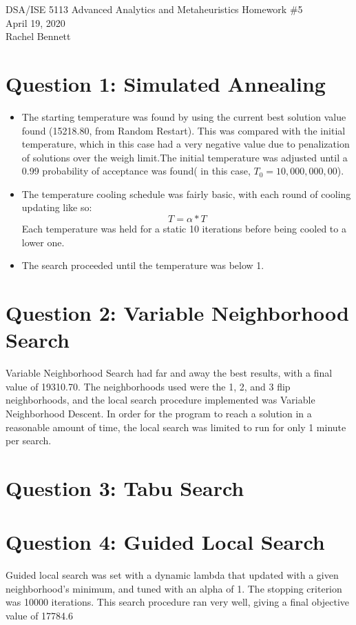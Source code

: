 \documentclass[12pt, letterpaper]{article}
\begin{document}
\begin{center}
\Large DSA/ISE 5113 Advanced Analytics and Metaheuristics
\Large Homework \#5\\
\vspace{3mm}
\normalsize April 19, 2020\\
\vspace{3mm}
\normalsize Rachel Bennett
\end{center}


\section*{Question 1: Simulated Annealing}
\begin{itemize}
\item The starting temperature was found by using the current best solution value found (15218.80, from Random Restart). This was compared with the initial temperature, which in this case had a very negative value due to penalization of solutions over the weigh limit.The initial temperature was adjusted until a 0.99 probability of acceptance was found( in this case, $T_0 =10,000,000,00$).
\item The temperature cooling schedule was fairly basic, with each round of cooling updating like so:
$$ T = \alpha * T$$
Each temperature was held for a static 10 iterations before being cooled to a lower one.
\item The search proceeded until the temperature was below 1. 
\end{itemize}

\section*{Question 2: Variable Neighborhood Search}
Variable Neighborhood Search had far and away the best results, with a final value of 19310.70. The neighborhoods used were the 1, 2, and 3 flip neighborhoods, and the local search procedure implemented was Variable Neighborhood Descent. In order for the program to reach a solution in a reasonable amount of time, the local search was limited to run for only 1 minute per search. 

\section*{Question 3: Tabu Search}



\section*{Question 4: Guided Local Search}
Guided local search was set with a dynamic lambda that updated with a given neighborhood's minimum, and tuned with an alpha of 1. The stopping criterion was 10000 iterations. This search procedure ran very well, giving a final objective value of 17784.6
\end{document}

